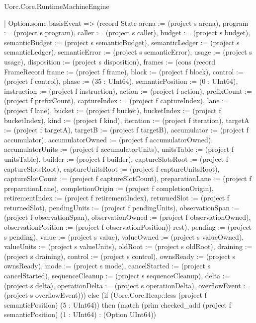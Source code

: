 \begin{lexlean}{Uorc.Core.RuntimeMachineEngine}
\begin{semanticmodule}
{        | Option.some basisEvent => (record State {arena := (project s arena), program := (project s program), caller := (project s caller), budget := (project s budget), semanticBudget := (project s semanticBudget), semanticLedger := (project s semanticLedger), semanticError := (project s semanticError), usage := (project s usage), disposition := (project s disposition), frames := (cons (record FrameRecord {frame := (project f frame), block := (project f block), control := (project f control), phase := (35 : UInt64), semanticPosition := (0 : UInt64), instruction := (project f instruction), action := (project f action), prefixCount := (project f prefixCount), captureIndex := (project f captureIndex), lane := (project f lane), bucket := (project f bucket), bucketIndex := (project f bucketIndex), kind := (project f kind), iteration := (project f iteration), targetA := (project f targetA), targetB := (project f targetB), accumulator := (project f accumulator), accumulatorOwned := (project f accumulatorOwned), accumulatorUnits := (project f accumulatorUnits), unitsTable := (project f unitsTable), builder := (project f builder), captureSlotsRoot := (project f captureSlotsRoot), captureUnitsRoot := (project f captureUnitsRoot), captureSlotCount := (project f captureSlotCount), preparationLane := (project f preparationLane), completionOrigin := (project f completionOrigin), retirementIndex := (project f retirementIndex), returnedSlot := (project f returnedSlot), pendingUnits := (project f pendingUnits), observationSpan := (project f observationSpan), observationOwned := (project f observationOwned), observationPosition := (project f observationPosition)}) rest), pending := (project s pending), value := (project s value), valueOwned := (project s valueOwned), valueUnits := (project s valueUnits), oldRoot := (project s oldRoot), draining := (project s draining), control := (project s control), ownsReady := (project s ownsReady), mode := (project s mode), cancelStarted := (project s cancelStarted), sequenceCleanup := (project s sequenceCleanup), delta := (project s delta), operationDelta := (project s operationDelta), overflowEvent := (project s overflowEvent)})) else (if (Uorc.Core.Heap::less (project f semanticPosition) (5 : UInt64)) then (match (prim checked_add (project f semanticPosition) (1 : UInt64) : (Option UInt64))
}
\end{semanticmodule}
\end{lexlean}
